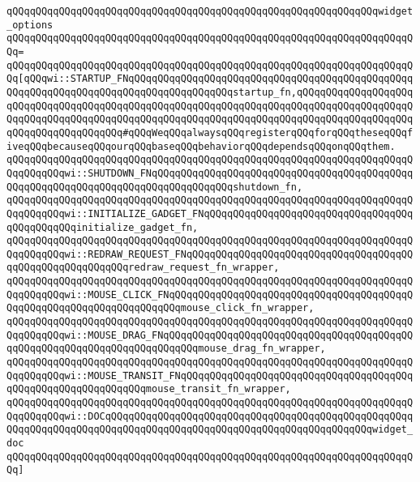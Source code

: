 \newline
\verb|qQQqqQQqqQQqqQQqqQQqqQQqqQQqqQQqqQQqqQQqqQQqqQQqqQQqqQQqqQQqqQQqwidget_options|\newline
\verb|qQQqqQQqqQQqqQQqqQQqqQQqqQQqqQQqqQQqqQQqqQQqqQQqqQQqqQQqqQQqqQQqqQQqqQQq=|\newline
\verb|qQQqqQQqqQQqqQQqqQQqqQQqqQQqqQQqqQQqqQQqqQQqqQQqqQQqqQQqqQQqqQQqqQQqqQQq[qQQqwi::STARTUP_FNqQQqqQQqqQQqqQQqqQQqqQQqqQQqqQQqqQQqqQQqqQQqqQQqqQQqqQQqqQQqqQQqqQQqqQQqqQQqqQQqqQQqqQQqstartup_fn,qQQqqQQqqQQqqQQqqQQqqQQqqQQqqQQqqQQqqQQqqQQqqQQqqQQqqQQqqQQqqQQqqQQqqQQqqQQqqQQqqQQqqQQqqQQqqQQqqQQqqQQqqQQqqQQqqQQqqQQqqQQqqQQqqQQqqQQqqQQqqQQqqQQqqQQqqQQqqQQqqQQqqQQqqQQqqQQqqQQq#qQQqWeqQQqalwaysqQQqregisterqQQqforqQQqtheseqQQqfiveqQQqbecauseqQQqourqQQqbaseqQQqbehaviorqQQqdependsqQQqonqQQqthem.|\newline
\verb|qQQqqQQqqQQqqQQqqQQqqQQqqQQqqQQqqQQqqQQqqQQqqQQqqQQqqQQqqQQqqQQqqQQqqQQqqQQqqQQqwi::SHUTDOWN_FNqQQqqQQqqQQqqQQqqQQqqQQqqQQqqQQqqQQqqQQqqQQqqQQqqQQqqQQqqQQqqQQqqQQqqQQqqQQqqQQqqQQqshutdown_fn,|\newline
\verb|qQQqqQQqqQQqqQQqqQQqqQQqqQQqqQQqqQQqqQQqqQQqqQQqqQQqqQQqqQQqqQQqqQQqqQQqqQQqqQQqwi::INITIALIZE_GADGET_FNqQQqqQQqqQQqqQQqqQQqqQQqqQQqqQQqqQQqqQQqqQQqqQQqinitialize_gadget_fn,|\newline
\verb|qQQqqQQqqQQqqQQqqQQqqQQqqQQqqQQqqQQqqQQqqQQqqQQqqQQqqQQqqQQqqQQqqQQqqQQqqQQqqQQqwi::REDRAW_REQUEST_FNqQQqqQQqqQQqqQQqqQQqqQQqqQQqqQQqqQQqqQQqqQQqqQQqqQQqqQQqqQQqredraw_request_fn_wrapper,|\newline
\verb|qQQqqQQqqQQqqQQqqQQqqQQqqQQqqQQqqQQqqQQqqQQqqQQqqQQqqQQqqQQqqQQqqQQqqQQqqQQqqQQqwi::MOUSE_CLICK_FNqQQqqQQqqQQqqQQqqQQqqQQqqQQqqQQqqQQqqQQqqQQqqQQqqQQqqQQqqQQqqQQqqQQqqQQqmouse_click_fn_wrapper,|\newline
\verb|qQQqqQQqqQQqqQQqqQQqqQQqqQQqqQQqqQQqqQQqqQQqqQQqqQQqqQQqqQQqqQQqqQQqqQQqqQQqqQQqwi::MOUSE_DRAG_FNqQQqqQQqqQQqqQQqqQQqqQQqqQQqqQQqqQQqqQQqqQQqqQQqqQQqqQQqqQQqqQQqqQQqqQQqqQQqmouse_drag_fn_wrapper,|\newline
\verb|qQQqqQQqqQQqqQQqqQQqqQQqqQQqqQQqqQQqqQQqqQQqqQQqqQQqqQQqqQQqqQQqqQQqqQQqqQQqqQQqwi::MOUSE_TRANSIT_FNqQQqqQQqqQQqqQQqqQQqqQQqqQQqqQQqqQQqqQQqqQQqqQQqqQQqqQQqqQQqqQQqmouse_transit_fn_wrapper,|\newline
\verb|qQQqqQQqqQQqqQQqqQQqqQQqqQQqqQQqqQQqqQQqqQQqqQQqqQQqqQQqqQQqqQQqqQQqqQQqqQQqqQQqwi::DOCqQQqqQQqqQQqqQQqqQQqqQQqqQQqqQQqqQQqqQQqqQQqqQQqqQQqqQQqqQQqqQQqqQQqqQQqqQQqqQQqqQQqqQQqqQQqqQQqqQQqqQQqqQQqqQQqqQQqwidget_doc|\newline
\verb|qQQqqQQqqQQqqQQqqQQqqQQqqQQqqQQqqQQqqQQqqQQqqQQqqQQqqQQqqQQqqQQqqQQqqQQq]|\newline
